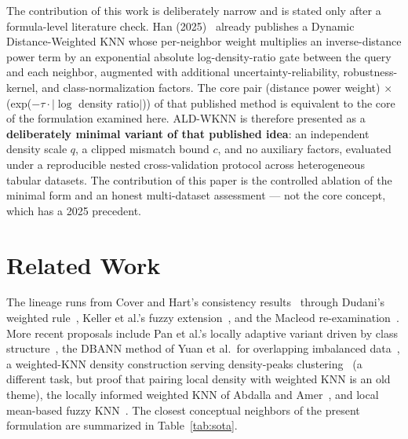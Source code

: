 \documentclass[conference]{IEEEtran}
\begin{document}
The contribution of this work is deliberately narrow and is stated only after a formula-level literature check. Han (2025)~\cite{dynamicdwknn2025} already publishes a Dynamic Distance-Weighted KNN whose per-neighbor weight multiplies an inverse-distance power term by an exponential absolute log-density-ratio gate between the query and each neighbor, augmented with additional uncertainty-reliability, robustness-kernel, and class-normalization factors. The core pair (distance power weight) $\times$ (exp($-\tau \cdot |\log$ density ratio$|$)) of that published method is equivalent to the core of the formulation examined here. ALD-WKNN is therefore presented as a \textbf{deliberately minimal variant of that published idea}: an independent density scale $q$, a clipped mismatch bound $c$, and no auxiliary factors, evaluated under a reproducible nested cross-validation protocol across heterogeneous tabular datasets. The contribution of this paper is the controlled ablation of the minimal form and an honest multi-dataset assessment --- not the core concept, which has a 2025 precedent.

\section{Related Work}

The lineage runs from Cover and Hart's consistency results~\cite{coverhart1967} through Dudani's weighted rule~\cite{dudani1976}, Keller et al.'s fuzzy extension~\cite{keller1985}, and the Macleod re-examination~\cite{macleod1987}. More recent proposals include Pan et al.'s locally adaptive variant driven by class structure~\cite{pan2020}, the DBANN method of Yuan et al.\ for overlapping imbalanced data~\cite{yuan2021}, a weighted-KNN density construction serving density-peaks clustering~\cite{ding2024} (a different task, but proof that pairing local density with weighted KNN is an old theme), the locally informed weighted KNN of Abdalla and Amer~\cite{abdalla2025}, and local mean-based fuzzy KNN~\cite{amer2025fuzzy}. The closest conceptual neighbors of the present formulation are summarized in Table~\ref{tab:sota}.
\end{document}
